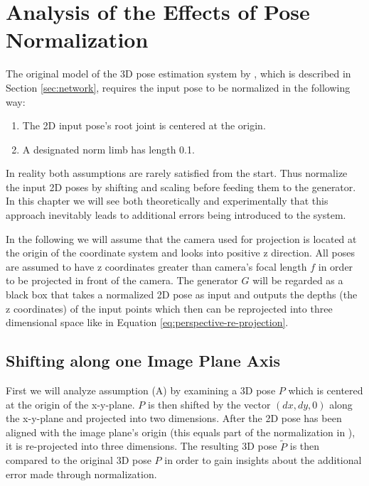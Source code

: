 \section{Analysis of the Effects of Pose Normalization}
\label{sec:effects-of-normalization}

The original model of the 3D pose estimation system by \citet{drover18}, which is described in Section \ref{sec:network}, requires the input pose to be normalized in the following way:
\begin{enumerate}[label=(\Alph*)]
	\item The 2D input pose's root joint is centered at the origin.
	\item A designated norm limb has length 0.1.
\end{enumerate}

In reality both assumptions are rarely satisfied from the start.
Thus \citet{drover18} normalize the input 2D poses by shifting and scaling before feeding them to the generator.
In this chapter we will see both theoretically and experimentally that this approach inevitably leads to additional errors being introduced to the system.


In the following we will assume that the camera used for projection is located at the origin of the coordinate system and looks into positive z direction.
All poses are assumed to have z coordinates greater than camera's focal length $f$ in order to be projected in front of the camera.
The generator $G$ will be regarded as a black box that takes a normalized 2D pose as input and outputs the depths (the z coordinates) of the input points which then can be reprojected into three dimensional space like in Equation \eqref{eq:perspective-re-projection}.


\subsection{Shifting along one Image Plane Axis}
\label{sec:x-shift-error}
First we will analyze assumption (A) by examining a 3D pose $P$ which is centered at the origin of the x-y-plane.
$P$ is then shifted by the vector $(dx, dy, 0)$ along the x-y-plane and projected into two dimensions.
After the 2D pose has been aligned with the image plane's origin (this equals part of the normalization in \cite{drover18}), it is re-projected into three dimensions.
The resulting 3D pose $\widetilde{P}$ is then compared to the original 3D pose $P$ in order to gain insights about the additional error made through normalization.

